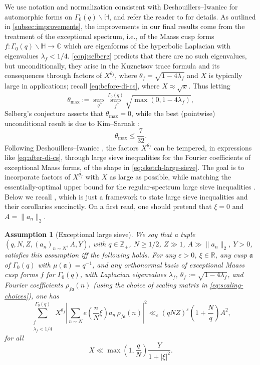 \documentclass[reqno,11pt]{amsart}
\newtheorem{assumption}[theorem]{Assumption}
\theoremstyle{remark}
\numberwithin{equation}{section}
\newcommand{\Z}{\mathbb{Z}}
\newcommand{\R}{\mathbb{R}}
\newcommand{\C}{\mathbb{C}}
\renewcommand{\H}{\mathbb{H}}
\newcommand{\ma}{\mathfrak{a}}
\newcommand{\eps}{\varepsilon}
\begin{document}
We use notation and normalization consistent with Deshouillers--Iwaniec \cite{deshouillers1982kloosterman} for automorphic forms on $\Gamma_0(q) \backslash \H$, and refer the reader to \cite[3.3]{pascadi2024large} for details. 
As outlined in \cref{subsec:improvements}, the improvements in our final results come from the treatment of the exceptional spectrum, i.e., of the Maass cusp forms $f : \Gamma_0(q) \backslash \H \to \C$ which are eigenforms of the hyperbolic Laplacian with eigenvalues $\lambda_f < 1/4$. \cref{conj:selberg} predicts that there are no such eigenvalues, but unconditionally, they arise in the Kuznetsov trace formula \cite{deshouillers1982greatest,kuznetsov1980petersson} and its consequences through factors of $X^{\theta_f}$, where $\theta_f = \sqrt{1 - 4\lambda_f}$ and $X$ is typically large in applications; recall \cref{eq:before-di-cs}, where $X \approx \sqrt{x}$. Thus letting
\[
    \theta_{\max} := \sup_{q} \sup_f^{\Gamma_0(q)} \sqrt{\max(0, 1 - 4\lambda_f)},
\]
Selberg's conjecture asserts that $\theta_{\max} = 0$, while the best (pointwise) unconditional result is due to Kim--Sarnak \cite[Appendix 2]{kim2003functoriality}:
\begin{equation} \label{eq:ks-bound}
    \theta_{\max} \le \frac{7}{32}.
\end{equation}
Following Deshouillers--Iwaniec \cite{deshouillers1982kloosterman}, the factors $X^{\theta_f}$ can be tempered, in expressions like \cref{eq:after-di-cs}, through large sieve inequalities for the Fourier coefficients of exceptional Maass forms, of the shape in \cref{eq:sketch-large-sieve}. The goal is to incorporate factors of $X^{\theta_f}$ with $X$ as large as possible, while matching the essentially-optimal upper bound for the regular-spectrum large sieve inequalities \cite[Theorem 2]{deshouillers1982kloosterman}. Below we recall \cite[Assumption 14]{pascadi2024large}, which is just a framework to state large sieve inequalities and their corollaries succinctly. On a first read, one should pretend that $\xi = 0$ and $A = \|a_n\|_2$.

\begin{assumption}[Exceptional large sieve] \label{ass:large-sieve}
We say that a tuple $(q, N, Z, (a_n)_{n \sim N}, A, Y)$, with $q \in \Z_+$, $N \ge 1/2$, $Z \gg 1$, $A \gg \|a_n\|_2$, $Y > 0$, satisfies this assumption iff the following holds. For any $\eps > 0$, $\xi \in \R$, any cusp $\ma$ of $\Gamma_0(q)$ with $\mu(\ma) = q^{-1}$, and any orthonormal basis of exceptional Maass cusp forms $f$ for $\Gamma_0(q)$, with Laplacian eigenvalues $\lambda_f$, $\theta_f := \sqrt{1-4\lambda_f}$, and Fourier coefficients $\rho_{f\ma}(n)$ (using the choice of scaling matrix in \cref{eq:scaling-choices}), one has
\[
    \sum_{\substack{f \\ \lambda_f < 1/4}}^{\Gamma_0(q)} X^{\theta_f} \left\vert \sum_{n \sim N} e\left(\frac{n}{N} \xi \right) a_n\, \rho_{f\ma}(n) \right\vert^2 
    \ll_\eps
    (qNZ)^\eps 
    \left(1 + \frac{N}{q}\right) 
     A^2,
\]
for all 
\begin{equation} \label{eq:x-saving-ass}
    X \ll \max\left(1, \frac{q}{N}\right) \frac{Y}{1+|\xi|^2}.
\end{equation}
\end{assumption}
\end{document}
